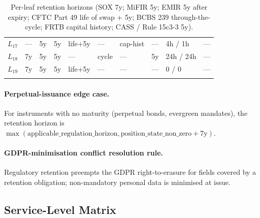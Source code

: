 \documentclass[11pt,a4paper]{article}
\begin{document}
\begin{center}
\begin{longtable}{@{}p{1.0cm}p{0.7cm}p{0.9cm}p{1.0cm}p{1.4cm}p{1.0cm}p{1.0cm}p{1.0cm}p{1.6cm}p{2.4cm}@{}}
$L_{17}$ & --- & 5y & 5y & life+5y & ---  & cap-hist & --- & 4h / 1h & --- \\
$L_{18}$ & 7y & 5y & 5y & ---    & cycle & ---     & 5y & 24h / 24h & --- \\
$L_{19}$ & 7y & 5y & 5y & life+5y & ---  & ---      & --- & 0 / 0   & --- \\
\caption{Per-leaf retention horizons (SOX 7y; MiFIR 5y; EMIR 5y after expiry; CFTC Part 49 life of swap + 5y; BCBS 239 through-the-cycle; FRTB capital history; CASS / Rule 15c3-3 5y).}
\label{tab:retention}
\end{longtable}
\end{center}

\paragraph{Perpetual-issuance edge case.} For instruments with no maturity (perpetual bonds, evergreen mandates), the retention horizon is $\max(\text{applicable\_regulation\_horizon}, \text{position\_state\_non\_zero} + 7\mathrm{y})$.

\paragraph{GDPR-minimisation conflict resolution rule.} Regulatory retention preempts the GDPR right-to-erasure for fields covered by a retention obligation; non-mandatory personal data is minimised at issue.

\subsection{Service-Level Matrix}
\label{sec:operational-sla}
\end{document}
